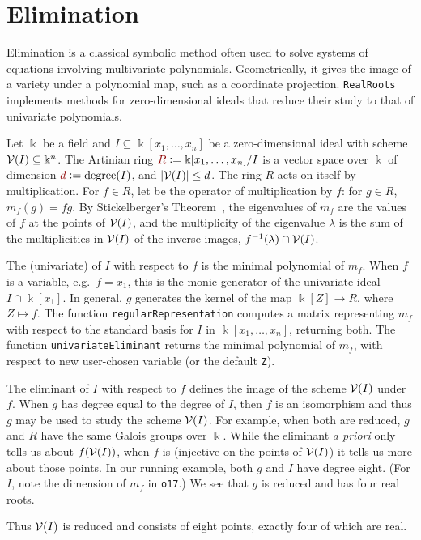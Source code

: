 


\section{Elimination}\label{S:two}

Elimination is a classical symbolic method often used to solve systems of equations involving multivariate polynomials.
Geometrically, it gives the image of a variety under a polynomial map, such as a coordinate projection.
\texttt{RealRoots} implements methods for zero-dimension\-al ideals that reduce their study to that of univariate polynomials.

Let  $\Bbbk$ be a field and $I\subseteq\Bbbk[x_1,\dotsc,x_n]$ be a zero-dimension\-al ideal  with scheme $\mathcal{V}(I)\subseteq\Bbbk^n$.
The Artinian ring $\defcolor{R}\vcentcolon=\Bbbk[x_1,\dotsc,x_n]/I$ is a vector space over $\Bbbk$ of dimension
$\defcolor{d}\vcentcolon=\mbox{degree}(I)$, and $|\mathcal{V}(I)|\leq d$.
The ring $R$ acts on itself by multiplication.
For $f\in R$, let  be the operator of multiplication by $f$: for $g\in R$, $m_f(g)=fg$.
By Stickelberger's Theorem~\cite{Cox2021}, the eigenvalues of $m_f$ are the values of $f$ at the  points of $\mathcal{V}(I)$,
and the multiplicity of the eigenvalue $\lambda$ is the sum of the multiplicities in $\mathcal{V}(I)$ of the inverse images,
$f^{-1}(\lambda)\cap\mathcal{V}(I)$. 


The (univariate)   of $I$ with respect to $f$ is the minimal polynomial of $m_f$.
When $f$ is a variable, e.g.\ $f=x_1$, this is the monic generator of the univariate ideal $I\cap\Bbbk[x_1]$.
In general, $g$ generates the kernel of the map $\Bbbk[Z]\to R$, where $Z\mapsto f$.
The function \texttt{regularRepresentation} computes a matrix representing $m_f$ with respect to the standard basis for $I$ in
$\Bbbk[x_1,\dotsc,x_n]$, returning both.
The function \texttt{univariateEliminant} returns the minimal polynomial of $m_f$, with respect to new user-chosen variable (or the default
\texttt{Z}). 
%
\begin{leftbar}

\end{leftbar}
%
The eliminant  of $I$ with respect to $f$ defines the image of the scheme $\mathcal{V}(I)$ under $f$.
When $g$ has degree equal to the degree of $I$, then $f$ is an isomorphism and thus $g$ may be used to study the scheme
$\mathcal{V}(I)$.
For example, when both are reduced, $g$ and $R$ have the same Galois groups over $\Bbbk$.
While the eliminant {\it a priori} only tells us about $f(\mathcal{V}(I))$, when $f$ is  (injective on the
points of $\mathcal{V}(I)$) it tells us more about those points.
In our running example, both $g$ and $I$ have degree eight. (For $I$, note the dimension of $m_f$ in \texttt{o17}.)
We see that $g$ is reduced and has four real roots.
%
\begin{leftbar}

\end{leftbar}
%
Thus $\mathcal{V}(I)$ is reduced and consists of eight points, exactly four of which are real.

